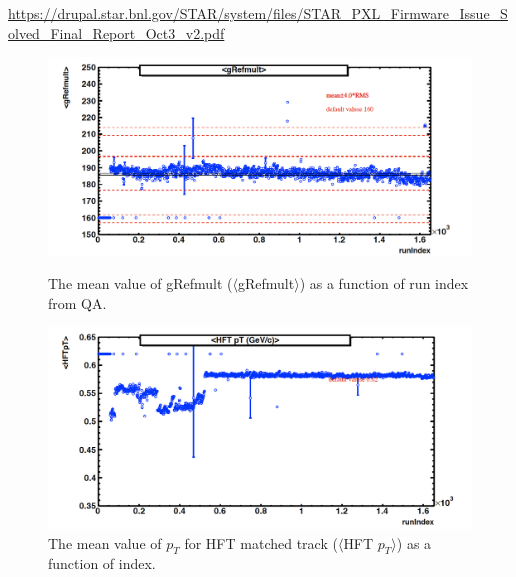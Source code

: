 \documentclass[a4paper]{article}
\begin{document}
\url{https://drupal.star.bnl.gov/STAR/system/files/STAR_PXL_Firmware_Issue_Solved_Final_Report_Oct3_v2.pdf}

\begin{figure}[htbp]
\begin{minipage}[htbp]{0.52\linewidth}
\centering
\includegraphics[width=1.0\textwidth]{fig/centrality_grefmult.png}
\caption{The mean value of gRefmult ($\langle$gRefmult$\rangle$) as a function of run index from QA.\label{fig:centrality_QA1}}
\end{minipage}
\hfill
\begin{minipage}[htbp]{0.52\linewidth}
\centering
\includegraphics[width=1.0\textwidth]{fig/centrality_HFTpt.png} 
\caption{The mean value of $p_{T}$ for HFT matched track ($\langle$HFT $p_{T}$$\rangle$) as a function of index.\label{fig:centrality_QA2}}
\end{minipage}
\end{figure}
\end{document}
